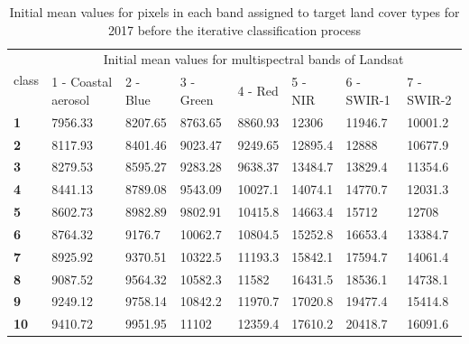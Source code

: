 \documentclass[jmse,article,submit,pdftex,moreauthors]{Definitions/mdpi}
\begin{document}
\begin{table}[H]
  \centering
  \begin{tabularx}{\textwidth}{p{0.7cm}p{2.5cm}p{1.0cm}p{1.3cm}p{1.0cm}p{1.0cm}p{1.5cm}p{1.5cm}}
  \toprule
  \multirow{2}{*}{class} & \multicolumn{7}{c}{Initial mean values for multispectral bands of Landsat} \\
     & 1 - Coastal aerosol & 2 - Blue & 3 - Green & 4 - Red & 5 - NIR & 6 - SWIR-1 & 7 - SWIR-2 \\
    \midrule
        \textbf{1} & 7956.33 & 8207.65 & 8763.65 & 8860.93 & 12306 & 11946.7 & 10001.2 \\
    \textbf{2} & 8117.93 & 8401.46 & 9023.47 & 9249.65 & 12895.4 & 12888 & 10677.9 \\
    \textbf{3} & 8279.53 & 8595.27 & 9283.28 & 9638.37 & 13484.7 & 13829.4 & 11354.6 \\
    \textbf{4} & 8441.13 & 8789.08 & 9543.09 & 10027.1 & 14074.1 & 14770.7 & 12031.3 \\
    \textbf{5} & 8602.73 & 8982.89 & 9802.91 & 10415.8 & 14663.4 & 15712 & 12708 \\
    \textbf{6} & 8764.32 & 9176.7 & 10062.7 & 10804.5 & 15252.8 & 16653.4 & 13384.7 \\
    \textbf{7} & 8925.92 & 9370.51 & 10322.5 & 11193.3 & 15842.1 & 17594.7 & 14061.4 \\
    \textbf{8} & 9087.52 & 9564.32 & 10582.3 & 11582 & 16431.5 & 18536.1 & 14738.1 \\
    \textbf{9} & 9249.12 & 9758.14 & 10842.2 & 11970.7 & 17020.8 & 19477.4 & 15414.8 \\
    \textbf{10} & 9410.72 & 9951.95 & 11102 & 12359.4 & 17610.2 & 20418.7 & 16091.6 \\
\bottomrule
\end{tabularx}
  \caption{Initial mean values for pixels in each band assigned to target land cover types for 2017 before the iterative classification process}
  \label{tabA3} 
\end{table} 
\end{document}
